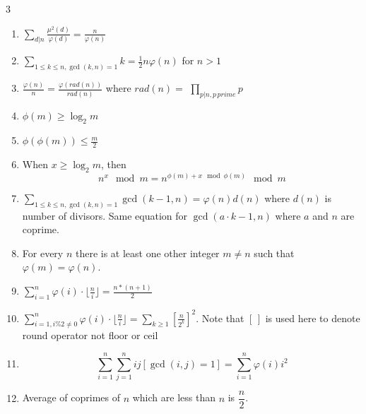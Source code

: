 \documentclass[8pt,a4paper,onesided]{article}
\begin{document}
\begin{multicols}{3}
\begin{enumerate}[resume]
    \item $\displaystyle \sum\limits_{d\vert{n}}^{} \frac{\mu^2(d)}{\varphi(d)}=\frac{n}{\varphi(n)}$
    \item $\displaystyle \sum\limits_{1\leq k \leq n, \gcd(k, n)=1}k=\frac{1}{2}n\varphi(n)$ for $n > 1$
    \item $\displaystyle \frac{\varphi(n)}{n}=\frac{\varphi(rad(n))}{rad(n)}$ where $rad(n)=$
    $\displaystyle \prod\limits_{p\vert n, p \, prime} p$
    \item $\displaystyle \phi(m) \geq \log_2{m}$
    \item $\displaystyle \phi(\phi(m))\leq\frac{m}{2}$
    \item When $\displaystyle x \geq \log_2m$, then
    \[n^x\mod m=n^{\phi(m) + x\mod \phi(m)}\mod m\]
    \item $\displaystyle \sum\limits_{1\leq k\leq n, \gcd(k, n)=1}\gcd(k-1, n)=\varphi(n)d(n)$ where $d(n)$ is number of divisors. Same equation for $\displaystyle \gcd(a \cdot k-1, n)$ where $\displaystyle a$ and $n$ are coprime.
    \item For every $n$ there is at least one other integer $m\ne n$ such that $\displaystyle \varphi(m)=\varphi(n).$
    \item $\displaystyle \sum\limits_{i=1}^{n} {\varphi(i) \cdot \lfloor\frac{n}{i}\rfloor=\frac{n*(n+1)}{2}}$
    \item $\displaystyle \sum\limits_{i=1, i \% 2 \ne 0 }^{n} \varphi(i) \cdot \lfloor\frac{n}{i}\rfloor=\sum\limits_{k\geq 1}[\frac{n}{2^k}]^2$.
    Note that $[\, ]$ is used here to denote round operator not floor or ceil
    \item \[\displaystyle \sum\limits_{i=1}^{n}\sum\limits_{j=1}^{n}ij[\gcd(i, j)=1]=\sum\limits_{i=1}^{n}\varphi(i)i^2\]
    \item Average of coprimes of $n$ which are less than $n$ is $\displaystyle \dfrac{n}{2}$.
\end{enumerate}

\end{multicols}
\end{document}
